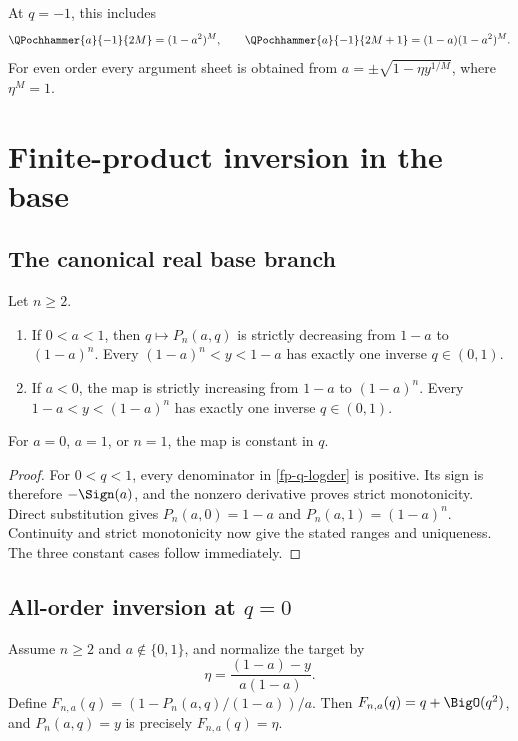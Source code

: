 At \(q=-1\), this includes
\[
 \QPochhammer{a}{-1}{2M}=(1-a^2)^M,\qquad
 \QPochhammer{a}{-1}{2M+1}=(1-a)(1-a^2)^M.
\]
For even order every argument sheet is obtained from
\(a=\pm\sqrt{1-\eta y^{1/M}}\), where \(\eta^M=1\).

\section{Finite-product inversion in the base}
\label{fp-base-inversion}

\subsection{The canonical real base branch}

\begin{theorem}
\label{fp-global-base}
Let \(n\geq2\).
\begin{enumerate}
\item If \(0<a<1\), then \(q\mapsto P_n(a,q)\) is strictly decreasing from
  \(1-a\) to \((1-a)^n\).  Every
  \((1-a)^n<y<1-a\) has exactly one inverse \(q\in(0,1)\).
\item If \(a<0\), the map is strictly increasing from \(1-a\) to
  \((1-a)^n\).  Every \(1-a<y<(1-a)^n\) has exactly one inverse
  \(q\in(0,1)\).
\end{enumerate}
For \(a=0\), \(a=1\), or \(n=1\), the map is constant in \(q\).
\end{theorem}

\begin{proof}
For \(0<q<1\), every denominator in \cref{fp-q-logder} is positive.  Its sign
is therefore \(-\Sign(a)\), and the nonzero derivative proves strict
monotonicity.  Direct substitution gives \(P_n(a,0)=1-a\) and
\(P_n(a,1)=(1-a)^n\).  Continuity and strict monotonicity now give the stated
ranges and uniqueness.  The three constant cases follow immediately.
\end{proof}

\subsection{\texorpdfstring{All-order inversion at \(q=0\)}{All-order inversion at q=0}}

Assume \(n\geq2\) and \(a\notin\{0,1\}\), and normalize the target by
\begin{equation}
 \eta=\frac{(1-a)-y}{a(1-a)}.
 \label{fp-small-base-coordinate}
\end{equation}
Define \(F_{n,a}(q)=(1-P_n(a,q)/(1-a))/a\).  Then
\(F_{n,a}(q)=q+\BigO(q^2)\), and \(P_n(a,q)=y\) is precisely
\(F_{n,a}(q)=\eta\).

